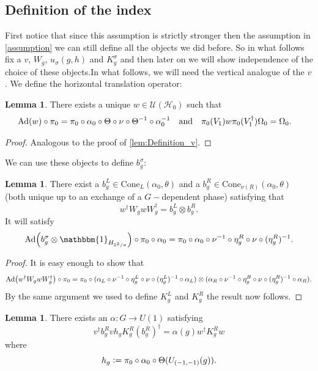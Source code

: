 \documentclass[12pt,a4paper,twoside]{article}
\newcommand{\defeq}{\vcentcolon=}
\let\originalleft\left
\let\originalright\right
\renewcommand{\left}{\mathopen{}\mathclose\bgroup\originalleft}
\renewcommand{\right}{\aftergroup\egroup\originalright}
\newcommand{\UU}{\mathcal U}
\newcommand{\HH}{\mathcal H}
\newcommand{\ZZ}{\mathbb Z}
\newcommand{\id}{\mathbbm{1}}
\newcommand{\Ad}[1]{\textrm{Ad}\left(#1\right)}
\theoremstyle{definition}
\newtheorem{lemma}[theorem]{Lemma}
\numberwithin{equation}{section}
\begin{document}
\subsection{Definition of the index}
 First notice that since this assumption is strictly stronger then the assumption in \ref{assumption} we can still define all the objects we did before. So in what follows fix a $v$, $W_g$, $u_\sigma(g,h)$ and $K_g^\sigma$ and then later on we will show independence of the choice of these objects.In what follows, we will need the vertical analogue of the $v$. We define the horizontal translation operator:
\begin{lemma}\label{lem:Definition_w}
	There exists a unique $w\in\UU(\HH_0)$ such that
	\begin{align}
		\Ad{w}\circ\pi_0&=\pi_0\circ\alpha_0\circ\Theta\circ\nu\circ\Theta^{-1}\circ\alpha_0^{-1}&&\text{and}&\pi_0(V_1)w\pi_0(V_1^\dagger)\Omega_0&=\Omega_0.
	\end{align}
\end{lemma}
\begin{proof}
	Analogous to the proof of \ref{lem:Definition_v}.
\end{proof}
 We can use these objects to define $b^\sigma_g$:
\begin{lemma}
	There exist a $b_g^L\in\textrm{Cone}_L(\alpha_0,\theta)$ and a $b_g^R\in\textrm{Cone}_{\nu(R)}(\alpha_0,\theta)$ (both unique up to an exchange of a $G-$dependent phase) satisfying that
	\begin{equation}
		w^\dagger W_g w W_g^\dagger=b_g^L\otimes b_g^R.
	\end{equation}
	It will satisfy
	\begin{equation}\label{eq:automorphismBelongingTo_b}
		\Ad{b_g^\sigma\otimes\id_{H_{\ZZ^2/\sigma}}}\circ\pi_0\circ\alpha_0=\pi_0\circ\alpha_0\circ\nu^{-1}\circ\eta_g^R\circ\nu\circ(\eta_g^R)^{-1}.
	\end{equation}
\end{lemma}
\begin{proof}
	It is easy enough to show that
	\begin{equation}
		\Ad{w^\dagger W_g w W_g^\dagger}\circ\pi_0=\pi_0\circ (\alpha_L\circ\nu^{-1}\circ\eta_g^L\circ\nu\circ(\eta_g^L)^{-1}\circ\alpha_L)\otimes(\alpha_R\circ\nu^{-1}\circ\eta_g^R\circ\nu\circ(\eta_g^R)^{-1}\circ\alpha_R).
	\end{equation}
	By the same argument we used to define $K_g^L$ and $K_g^R$ the result now follows.
\end{proof}
\begin{lemma}\label{lem:DefinitionAlpha}
	There exists an $\alpha:G\rightarrow U(1)$ satisfying
	\begin{equation}\label{eq:DefinitionOfTheH_1Index}
		v^\dagger b_g^R vh_g K_g^R (b_g^R)^\dagger=\alpha(g)w^\dagger K_g^R w
	\end{equation}
	where
	\begin{equation}
		h_g\defeq\pi_0\circ\alpha_0\circ\Theta(U_{(-1,-1)}(g)).
	\end{equation}
\end{lemma}
\end{document}
